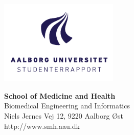 {}
\thispagestyle{empty}

\begin{minipage}[t]{0.48\textwidth}
\vspace*{-25pt}			%
\includegraphics[height=4cm]{billeder/AAU-logo-stud-DK-RGB}
\end{minipage}
\hfill
\begin{minipage}[t]{0.48\textwidth}
{\small 
\textbf{School of Medicine and Health}  \\
Biomedical Engineering and Informatics\\
Niels Jernes Vej 12, 9220 Aalborg Øst \\
http://www.smh.aau.dk}

\end{minipage}

\vspace*{1cm}

